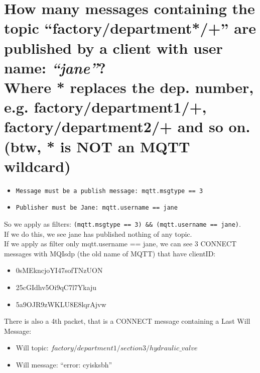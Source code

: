 \documentclass{article} %
\begin{document}
 \section[Section Title. Section Subtitle]{\large{How many messages containing the topic “factory/department*/+” are published by a client with user name:
 \textit{“jane”}?} \\ {\normalsize{Where * replaces the dep. number, e.g. factory/department1/+, factory/department2/+ and so on. (btw, * is NOT an MQTT wildcard)}}}
    \begin{itemize}
        \item \texttt{Message must be a publish message: mqtt.msgtype == 3}
        \item \texttt{Publisher must be Jane: mqtt.username == jane}
    \end{itemize}
    So we apply as filters: \texttt{(mqtt.msgtype == 3) \&\& (mqtt.username == jane)}.\\
    If we do this, we see jane has published nothing of any topic. \\
    If we apply as filter only mqtt.username == jane, we can see 3 CONNECT messages with MQIsdp (the old name of MQTT) that have clientID:
    \begin{itemize}
        \item 0sMEkncjoYI47sofTNzUON
        \item 25cGIdhv5Oi9qC7l7Ykaju
        \item 5a9OJR9zWKLU8E8lqrAjvw
    \end{itemize}
    There is also a 4th packet, that is a CONNECT message containing a Last Will Message:
    \begin{itemize}
        \item Will topic: \texttt{$factory/department1/section3/hydraulic\_valve$}
        \item Will message: “error: cyisksbh”
    \end{itemize}
    
\end{document}
